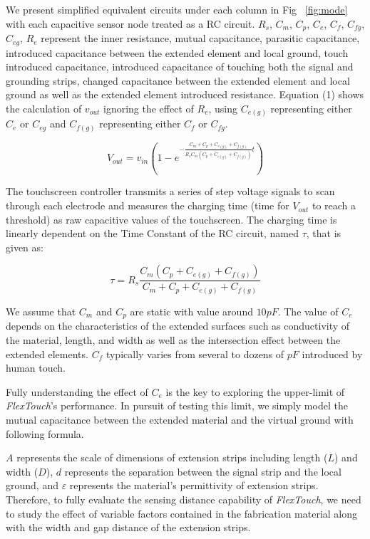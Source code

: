 We present simplified equivalent circuits under each column in Fig ~\ref{fig:mode} with each capacitive sensor node treated as a RC circuit. $R_{s}$, $C_{m}$, $C_{p}$, $C_{e}$, $C_{f}$, $C_{fg}$,$C_{eg}$, $R_{e}$ represent the inner resistance, mutual capacitance, parasitic capacitance, introduced capacitance between the extended element and local ground, touch introduced capacitance, introduced capacitance of touching both the signal and grounding strips, changed capacitance between the extended element and local ground as well as the extended element introduced resistance. Equation (1) shows the calculation of $v_{out}$ ignoring the effect of $R_{e}$, using $C_{e(g)}$ representing either $C_{e}$ or $C_{eg}$ and $C_{f(g)}$ representing either $C_{f}$ or $C_{fg}$.

\begin{equation}
    V_{out} = v_{in}(1-e^{-\frac{C_{m} + C_{p} + C_{e(g)} + C_{f(g)}}{R_{s}C_{m}(C_{p} + C_{e(g)} + C_{f(g)})}t})
\end{equation}


The touchscreen controller transmits a series of step voltage signals to scan through each electrode and measures the charging time (time for $V_{out}$ to reach a threshold) as raw capacitive values of the touchscreen. The charging time is linearly dependent on the Time Constant of the RC circuit, named $\tau$, that is given as:

\begin{equation}
    \tau = R_{s}\frac{C_{m}(C_{p} + C_{e(g)} + C_{f(g)})}{C_{m} + C_{p} + C_{e(g)} + C_{f(g)}}
\end{equation}

 
We assume that $C_{m}$ and $C_{p}$ are static with value around $10pF$. The value of $C_{e}$ depends on the characteristics of the extended surfaces such as conductivity of the material, length, and width as well as the intersection effect between the extended elements. $C_{f}$ typically varies from several to dozens of $pF$ introduced by human touch. 

Fully understanding the effect of $C_{e}$ is the key to exploring the upper-limit of \textit{FlexTouch}'s performance. In pursuit of testing this limit, we simply model the mutual capacitance between the extended material and the virtual ground with following formula.

$A$ represents the scale of dimensions of extension strips including length ($L$) and width ($D$), $d$ represents the separation between the signal strip and the local ground, and $\varepsilon$ represents the material's permittivity of extension strips. Therefore, to fully evaluate the sensing distance capability of \textit{FlexTouch}, we need to study the effect of variable factors contained in the fabrication material along with the width and gap distance of the extension strips.